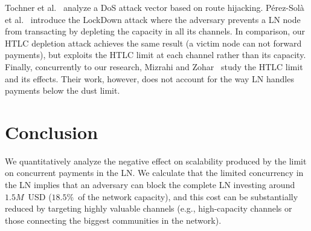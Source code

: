 Tochner et al.~\cite{Tochner2019} analyze a DoS attack vector based on route hijacking. 
P{\'{e}}rez{-}Sol{\`{a}} et al.~\cite{PerezSola2019} introduce the LockDown attack where the adversary 
prevents a LN node from transacting by depleting the capacity in all its channels.
In comparison, our HTLC depletion attack achieves the same result (a victim node can not forward payments), but exploits the HTLC limit at each channel rather than its capacity.
Finally, concurrently to our research, Mizrahi and Zohar~\cite{Mizrahi2020} study the HTLC limit and its effects.
Their work, however, does not account for the way LN handles payments below the dust limit.

\section{Conclusion}

We quantitatively analyze the negative effect on scalability produced by the limit on concurrent payments in the LN. 
We calculate that the limited concurrency in the LN implies that an adversary can block the complete LN investing around $1.5M$~USD ($18.5\%$~of the network capacity), and this cost can be substantially reduced by targeting highly valuable channels (e.g., high-capacity channels or those connecting the biggest communities in the network).